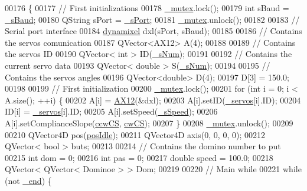 \begin{DoxyCode}
00176 \{
00177     \textcolor{comment}{// First initializations}
00178     \hyperlink{a00009_a6327eafc0dac189ec1b202d63ef32457}{\_mutex}.lock();
00179     \textcolor{keywordtype}{int} sBaud = \hyperlink{a00009_a5b9a41b9e271275b914affb0a845a2ee}{\_sBaud};
00180     QString sPort = \hyperlink{a00009_ac9a614aa1518efb49b0a06636bd1bdbf}{\_sPort};
00181     \hyperlink{a00009_a6327eafc0dac189ec1b202d63ef32457}{\_mutex}.unlock();
00182     
00183     \textcolor{comment}{// Serial port interface}
00184     \hyperlink{a00004}{dynamixel} dxl(sPort, sBaud);
00185     
00186     \textcolor{comment}{// Contains the servos comunication}
00187     QVector<AX12> A(4);
00188     
00189     \textcolor{comment}{// Contains the servos ID}
00190     QVector< int > ID(\hyperlink{a00009_a334e0c5bca9ccb2585cb82bce60ea42f}{\_sNum});
00191     
00192     \textcolor{comment}{// Contains the current servo data}
00193     QVector< double > S(\hyperlink{a00009_a334e0c5bca9ccb2585cb82bce60ea42f}{\_sNum});
00194     
00195     \textcolor{comment}{// Contains the servos angles}
00196     QVector<double> D(4);
00197     D[3] = 150.0;
00198     
00199     \textcolor{comment}{// First initialization}
00200     \hyperlink{a00009_a6327eafc0dac189ec1b202d63ef32457}{\_mutex}.lock();
00201     \textcolor{keywordflow}{for} (\textcolor{keywordtype}{int} i = 0; i < A.size(); ++i) \{
00202         A[i] = \hyperlink{a00001}{AX12}(&dxl);  
00203         A[i].setID(\hyperlink{a00009_a1ac6662fe6d198b5971ae0ffa7ddfcfd}{\_servos}[i].ID);
00204         ID[i] = \hyperlink{a00009_a1ac6662fe6d198b5971ae0ffa7ddfcfd}{\_servos}[i].ID;
00205         A[i].setSpeed(\hyperlink{a00009_a2591c704c80518be7abb1698364cab5e}{\_sSpeed});
00206         A[i].setComplianceSlope(\hyperlink{a00009_ac2d1087cd0cc45ef71c77aa20b41ceda}{ccwCS}, \hyperlink{a00009_a67b2528edcaa375aefa1fb4117576665}{cwCS});
00207     \}
00208     \hyperlink{a00009_a6327eafc0dac189ec1b202d63ef32457}{\_mutex}.unlock();
00209     
00210     QVector4D pos(\hyperlink{a00009_a2f5ebef53b31216cb54235264ba9f8d0}{posIdle});
00211     QVector4D axis(0, 0, 0, 0);
00212     QVector< bool > buts;
00213     
00214     \textcolor{comment}{// Contains the domino number to put}
00215     \textcolor{keywordtype}{int} dom = 0;
00216     \textcolor{keywordtype}{int} pas = 0;
00217     \textcolor{keywordtype}{double} speed = 100.0;
00218     QVector< QVector< Dominoe > > Dom;
00219     
00220     \textcolor{comment}{// Main while}
00221     \textcolor{keywordflow}{while} (not \hyperlink{a00009_acca9896d1a2d1ef68527e6834f81c76c}{\_end}) \{

\end{DoxyCode}
